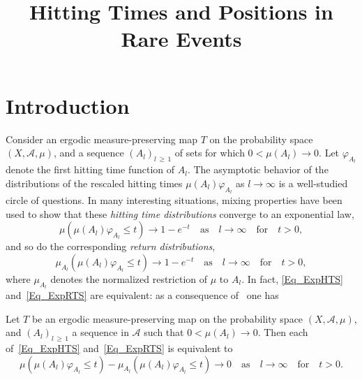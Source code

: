 \documentclass[AHL,Unicode,longabstracts]{cedram}
\title[Hitting Times and Positions in Rare Events]{Hitting Times and Positions in Rare Events}
\author[\initial{R.} \lastname{Zweim{\"u}ller}]{\firstname{Roland} \lastname{Zweim{\"u}ller}}
\newcommand{\clA}{\mathcal{A}}
\begin{document}
\maketitle

\section{Introduction}

Consider an ergodic measure-preserving map $T$ on the probability space $(X,\clA,\mu)$, and a sequence $(A_{l})_{l\,\geq\,1}$ of sets for which $0<\mu(A_{l})\rightarrow0$. Let $\varphi_{A_{l}}$ denote the first hitting time function of $A_{l}$. The asymptotic behavior of the distributions of the rescaled hitting times $\mu(A_{l})\varphi_{A_{l}}$ as $l\rightarrow\infty$ is a well-studied circle of questions. In many interesting situations, mixing properties have been used to show that these \emph{hitting time distributions} converge to an exponential law,
\begin{equation}\label{Eq_ExpHTS}
\mu\left(\mu(A_{l})\varphi_{A_{l}}\leq t\right)\longrightarrow1-e^{-t} \quad\text{as}\quad l\rightarrow\infty\quad\text{for} \quad t>0, 
\end{equation}
and so do the corresponding \emph{return distributions},
\begin{equation}\label{Eq_ExpRTS}
\mu_{A_{l}}\left(\mu(A_{l})\varphi_{A_{l}}\leq t\right)\longrightarrow1-e^{-t}\quad \text{as}\quad l\rightarrow\infty\quad \text{for}\quad t>0, 
\end{equation}
where $\mu_{A_{l}}$ denotes the normalized restriction of $\mu$ to $A_{l}$. In fact, \eqref{Eq_ExpHTS} and~\eqref{Eq_ExpRTS} are equivalent: as a consequence of~\cite[Theorem~2.1]{HSV} one has

\begin{prop}\label{prop1.1}
Let $T$ be an ergodic measure-preserving map on the probability space $(X,\clA,\mu)$, and $(A_{l})_{l\,\geq\,1}$ a sequence in $\clA$ such that $0<\mu (A_{l})\rightarrow0$. Then each of~\eqref{Eq_ExpHTS} and~\eqref{Eq_ExpRTS} is equivalent to
\begin{equation}\label{Eq_Char_EXPHRTS}
\mu\left(\mu(A_{l})\varphi_{A_{l}}\leq t\right)-\mu_{A_{l}}\left(\mu(A_{l})\varphi_{A_{l}}\leq t\right)\longrightarrow0\quad \text{as}\quad l\rightarrow\infty\quad \text{for}\quad t>0. 
\end{equation}
\end{prop}
\end{document}
